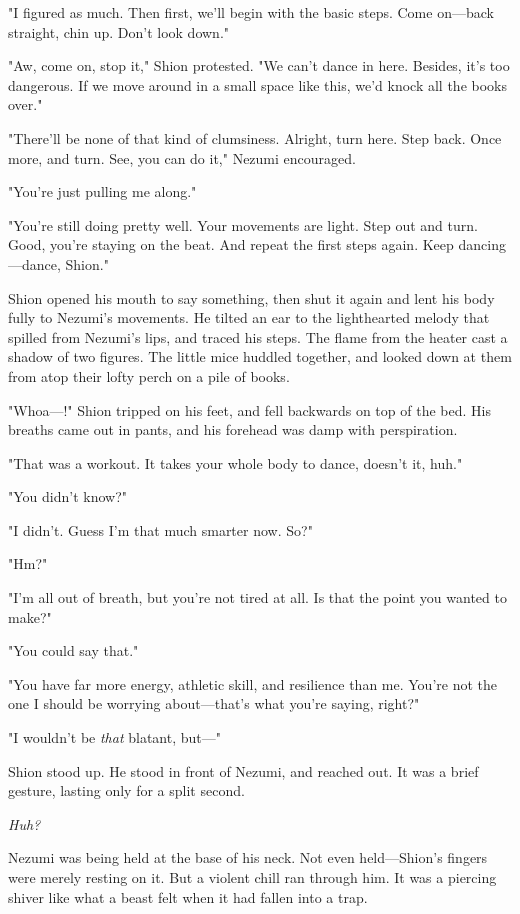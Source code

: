 "I figured as much. Then first, we'll begin with the basic steps. Come
on---back straight, chin up. Don't look down."

"Aw, come on, stop it," Shion protested. "We can't dance in here.
Besides, it's too dangerous. If we move around in a small space like
this, we'd knock all the books over."

"There'll be none of that kind of clumsiness. Alright, turn here. Step
back. Once more, and turn. See, you can do it," Nezumi encouraged.

"You're just pulling me along."

"You're still doing pretty well. Your movements are light. Step out and
turn. Good, you're staying on the beat. And repeat the first steps
again. Keep dancing---dance, Shion."

Shion opened his mouth to say something, then shut it again and lent his
body fully to Nezumi's movements. He tilted an ear to the lighthearted
melody that spilled from Nezumi's lips, and traced his steps. The flame
from the heater cast a shadow of two figures. The little mice huddled
together, and looked down at them from atop their lofty perch on a pile
of books.

"Whoa---!" Shion tripped on his feet, and fell backwards on top of the
bed. His breaths came out in pants, and his forehead was damp with
perspiration.

"That was a workout. It takes your whole body to dance, doesn't it,
huh."

"You didn't know?"

"I didn't. Guess I'm that much smarter now. So?"

"Hm?"

"I'm all out of breath, but you're not tired at all. Is that the point
you wanted to make?"

"You could say that."

"You have far more energy, athletic skill, and resilience than me.
You're not the one I should be worrying about---that's what you're saying,
right?"

"I wouldn't be \emph{that} blatant, but---"

Shion stood up. He stood in front of Nezumi, and reached out. It was a
brief gesture, lasting only for a split second.

\emph{Huh?}

Nezumi was being held at the base of his neck. Not even held---Shion's
fingers were merely resting on it. But a violent chill ran through him.
It was a piercing shiver like what a beast felt when it had fallen into
a trap.

